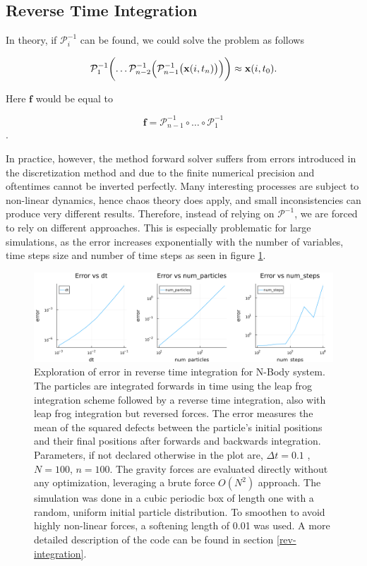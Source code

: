 \documentclass{article}
\begin{document}
\subsection{Reverse Time Integration}
 
In theory, if $\mathcal{P}_i^{-1}$ can be found, we could solve the problem as follows

\begin{equation}
    \mathcal{P}_{1}^{-1} \biggl( \dots \mathcal{P}_{n-2}^{-1}\Bigl(\mathcal{P}_{n-1}^{-1}\bigl(\mathbf{x}(i, t_{n})\bigr)\Bigr)\biggr) \approx \mathbf{x}(i, t_{0}).
\end{equation}

Here $\mathbf{f}$ would be equal to 

\begin{equation}
    \mathbf{f} = \mathcal{P}_{n-1}^{-1} \circ \dots \circ \mathcal{P}_1^{-1}
\end{equation}.

In practice, however, the method forward solver suffers from errors introduced in the discretization method and due to the finite numerical precision and oftentimes cannot be inverted perfectly. Many interesting processes are subject to non-linear dynamics, hence chaos theory does apply, and small inconsistencies can produce very different results. Therefore, instead of relying on $\mathcal{P}^{-1}$, we are forced to rely on different approaches. This is especially problematic for large simulations, as the error increases exponentially with the number of variables, time steps size and number of time steps as seen in figure \ref{fig:error_inverse}.

\begin{figure}
    \centering
    \includegraphics[width=0.8\linewidth]{img/error.png}
    \caption{Exploration of error in reverse time integration for N-Body system. The particles are integrated forwards in time using the leap frog integration scheme followed by a reverse time integration, also with leap frog integration but reversed forces. The error measures the mean of the squared defects between the particle's initial positions and their final positions after forwards and backwards integration. Parameters, if not declared otherwise in the plot are, $\Delta t= 0.1$ , $N = 100$, $n = 100$. The gravity forces are evaluated directly without any optimization, leveraging a brute force $O(N^2)$ approach. The simulation was done in a cubic periodic box of length one with a random, uniform initial particle distribution. To smoothen to avoid highly non-linear forces, a softening length of 0.01 was used. A more detailed description of the code can be found in section \ref{rev-integration}.}
    \label{fig:error_inverse}
\end{figure}
\end{document}
